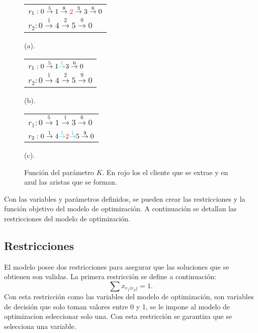 \documentclass[12pt]{report}
\begin{document}
\begin{itemize}
		\begin{figure}[!h]
		\vspace{0.5em}
		\centering
		\begin{minipage}{0.45\textwidth}
			\begin{tabular}{l}
				$r_1: 0 \overset{5}{\rightarrow} 1\overset{8}{\rightarrow} \textcolor{red}{2} \overset{3}{\rightarrow} 3\overset{6}{\rightarrow} 0$\\
				$r_2: 0\overset{1}{\rightarrow} 4\overset{2}{\rightarrow} 5\overset{9}{\rightarrow} 0$
			\end{tabular}
			\caption*{(a).}
		\end{minipage}
		\begin{minipage}{0.45\textwidth}
			\begin{tabular}{l}
				$r_1: 0 \overset{5}{\rightarrow} 1 \textcolor{cyan}{\overset{1}{\rightarrow}} 3\overset{6}{\rightarrow} 0$\\
				$r_2: 0\overset{1}{\rightarrow} 4\overset{2}{\rightarrow} 5\overset{9}{\rightarrow} 0$
			\end{tabular}
			\caption*{(b).}
		\end{minipage}
		\vspace{0.5em}
		\begin{minipage}{0.45\textwidth}
			\begin{tabular}{l}
				$r_1: 0 \overset{5}{\rightarrow} 1\overset{1}{\rightarrow} 3\overset{6}{\rightarrow} 0$\\
				$r_2: 0\overset{1}{\rightarrow} 4\textcolor{cyan}{\overset{1}{\rightarrow}} \textcolor{red}{2} \textcolor{cyan}{\overset{1}{\rightarrow}} 5\overset{9}{\rightarrow} 0$
			\end{tabular}
			\caption*{(c).}
		\end{minipage}
		\caption{Función del parámetro $K$. En rojo los el cliente que se extrae y en azul las aristas que se forman.}
		\label{fig:parameter graph}
		\end{figure}
	\end{itemize}

	Con las variables y parámetros definidos, se pueden crear las restricciones y la función objetivo del modelo de optimización. A continuación se detallan las restricciones del modelo de optimización.

    \subsection{Restricciones}
    El modelo posee dos restricciones para asegurar que las soluciones que se obtienen son validas. La primera restricción se define a continuación:
    \[
    \sum  x_{r_1ir_2j} = 1.
    \]
    Con esta restricción como las variables del modelo de optimización, son variables de decisión que solo toman valores entre 0 y 1, se le impone al modelo de optimizacion seleccionar solo una. Con esta restricción se garantiza que se selecciona una variable.
\end{document}
